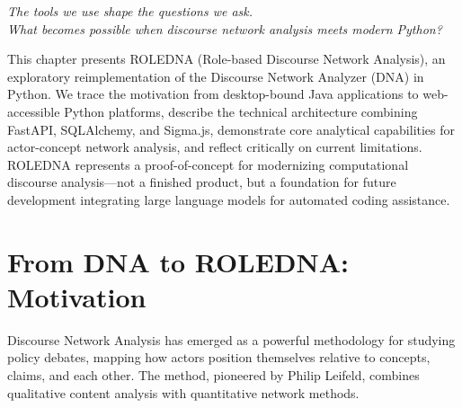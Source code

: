 \documentclass[../main.tex]{subfiles}
\begin{document}

\begin{center}
\end{center}

\vspace{1cm}

\begin{center}
\textit{\large The tools we use shape the questions we ask.\\[0.3em]
What becomes possible when discourse network analysis meets modern Python?}
\end{center}

\vspace{1.5cm}

\begin{chapteroverview}
This chapter presents ROLEDNA (Role-based Discourse Network Analysis), an exploratory reimplementation of the Discourse Network Analyzer (DNA) in Python. We trace the motivation from desktop-bound Java applications to web-accessible Python platforms, describe the technical architecture combining FastAPI, SQLAlchemy, and Sigma.js, demonstrate core analytical capabilities for actor-concept network analysis, and reflect critically on current limitations. ROLEDNA represents a proof-of-concept for modernizing computational discourse analysis---not a finished product, but a foundation for future development integrating large language models for automated coding assistance.
\end{chapteroverview}


\section*{From DNA to ROLEDNA: Motivation}

Discourse Network Analysis has emerged as a powerful methodology for studying policy debates, mapping how actors position themselves relative to concepts, claims, and each other. The method, pioneered by Philip Leifeld, combines qualitative content analysis with quantitative network methods.
\end{document}
